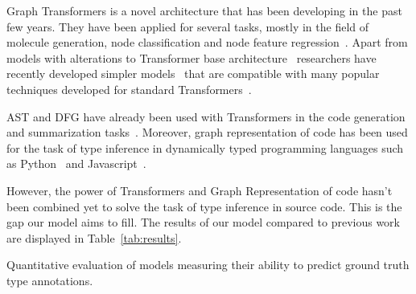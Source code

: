 Graph Transformers is a novel architecture that has been developing in the past few years.
They have been applied for several tasks, mostly in the field of molecule generation, node classification and node feature regression~\cite{kim_pure_2022,kreuzer_rethinking_2021,dwivedi_generalization_2021,ying_transformers_2021}.
Apart from models with alterations to Transformer base architecture~\cite{ying_transformers_2021, kreuzer_rethinking_2021}
researchers have recently developed simpler models~\cite{kim_pure_2022} that are compatible with many popular techniques developed for
standard Transformers~\cite{choromanski_rethinking_2020}.

AST and DFG have already been used with Transformers in the code generation and summarization tasks~\cite{wang_unified_2022,tang_ast-transformer_2021,sun_treegen_2020}.
Moreover, graph representation of code has been used for the task of type inference in dynamically typed programming languages such as Python~\cite{allamanis2020typilus} and Javascript~\cite{schrouff_inferring_2019}.

However, the power of Transformers and Graph Representation of code hasn't been combined yet to solve the task of
type inference in source code.
This is the gap our model aims to fill.
The results of our model compared to previous work~\cite{mir_type4py_2021, allamanis2020typilus, pradel2020typewriter, jesse2021typebert, peng2023generative} are displayed in Table~\ref{tab:results}.

\begin{table}
    \centering
    \caption{Quantitative evaluation of models measuring their ability to
    predict ground truth type annotations.}
    \label{tab:results}
    
\end{table}